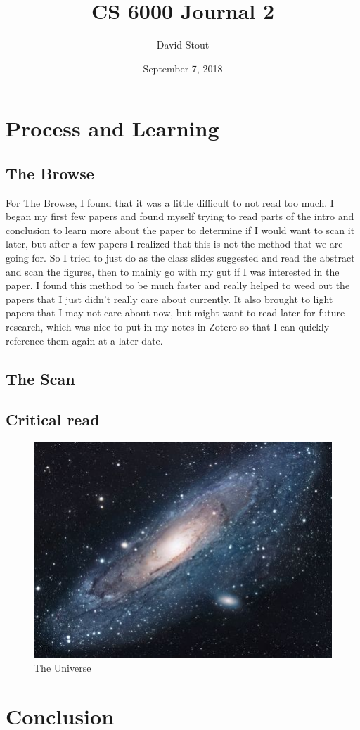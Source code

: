\documentclass{article}
\title{CS 6000 Journal 2}
\author{David Stout}
\date{September 7, 2018}
\begin{document}
\maketitle

\section{Process and Learning}
\subsection{The Browse}
For The Browse, I found that it was a little difficult to not read too much. I began my first few papers and found myself trying to read parts of the intro and conclusion to learn more about the paper to determine if I would want to scan it later, but after a few papers I realized that this is not the method that we are going for. So I tried to just do as the class slides suggested and read the abstract and scan the figures, then to mainly go with my gut if I was interested in the paper. I found this method to be much faster and really helped to weed out the papers that I just didn't really care about currently. It also brought to light papers that I may not care about now, but might want to read later for future research, which was nice to put in my notes in Zotero so that I can quickly reference them again at a later date.
\subsection{The Scan}

\subsection{Critical read}

\begin{figure}[h!]
\centering
\includegraphics[scale=1.7]{universe}
\caption{The Universe}
\label{fig:universe}
\end{figure}

\section{Conclusion}


\nocite{*}



\end{document}
